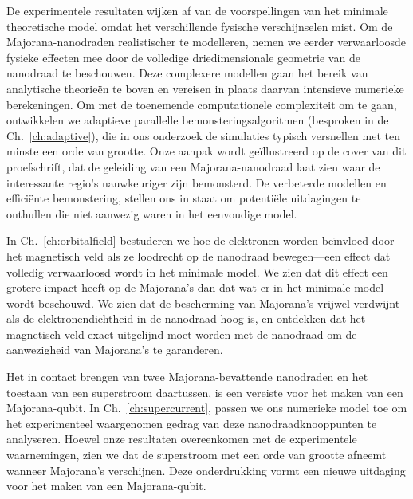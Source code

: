 {
De experimentele resultaten wijken af van de voorspellingen van het minimale theoretische model omdat het verschillende fysische verschijnselen mist.
Om de Majorana-nanodraden realistischer te modelleren, nemen we eerder verwaarloosde fysieke effecten mee door de volledige driedimensionale geometrie van de nanodraad te beschouwen.
Deze complexere modellen gaan het bereik van analytische theorieën te boven en vereisen in plaats daarvan intensieve numerieke berekeningen.
Om met de toenemende computationele complexiteit om te gaan, ontwikkelen we adaptieve parallelle bemonsteringsalgoritmen (besproken in de Ch.~\ref{ch:adaptive}), die in ons onderzoek de simulaties typisch versnellen met ten minste een orde van grootte.
Onze aanpak wordt geïllustreerd op de cover van dit proefschrift, dat de geleiding van een Majorana-nanodraad laat zien waar de interessante regio's nauwkeuriger zijn bemonsterd.
De verbeterde modellen en efficiënte bemonstering, stellen ons in staat om potentiële uitdagingen te onthullen die niet aanwezig waren in het eenvoudige model.

In Ch.~\ref{ch:orbitalfield} bestuderen we hoe de elektronen worden beïnvloed door het magnetisch veld als ze loodrecht op de nanodraad bewegen---een effect dat volledig verwaarloosd wordt in het minimale model.
We zien dat dit effect een grotere impact heeft op de Majorana's dan dat wat er in het minimale model wordt beschouwd.
We zien dat de bescherming van Majorana's vrijwel verdwijnt als de elektronendichtheid in de nanodraad hoog is, en ontdekken dat het magnetisch veld exact uitgelijnd moet worden met de nanodraad om de aanwezigheid van Majorana's te garanderen.

Het in contact brengen van twee Majorana-bevattende nanodraden en het toestaan van een superstroom daartussen, is een vereiste voor het maken van een Majorana-qubit.
In Ch.~\ref{ch:supercurrent}, passen we ons numerieke model toe om het experimenteel waargenomen gedrag van deze nanodraadknooppunten te analyseren.
Hoewel onze resultaten overeenkomen met de experimentele waarnemingen, zien we dat de superstroom met een orde van grootte afneemt wanneer Majorana's verschijnen.
Deze onderdrukking vormt een nieuwe uitdaging voor het maken van een Majorana-qubit.

}
